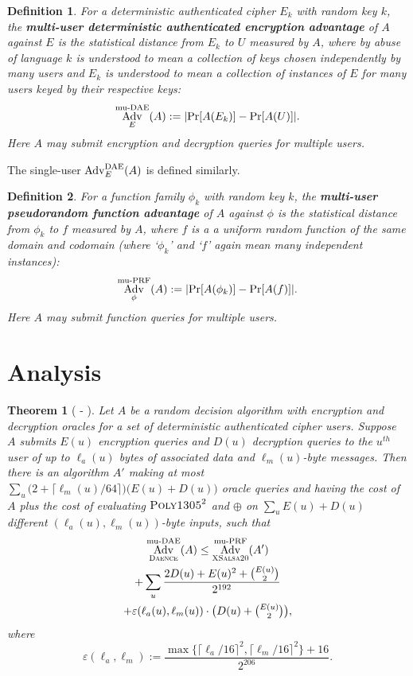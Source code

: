 \documentclass[draft]{article}
\newtheorem{definition}{Definition}
\newtheorem{theorem}{Theorem}
\newcommand{\term}[1]{\textbf{#1}}
\def\operatorsc#1{{%
  \ifmmode\let\next=\operatorname\else\let\next=\relax\fi\next{\textsc{#1}}}}
\def\Salsa#1/{\operatorsc{Salsa#1}}
\def\XSalsa#1/{\operatorsc{XSalsa#1}}
\def\Poly#1/{\operatorsc{Poly#1}}
\def\Daence/{\operatorsc{Daence}}
\def\muPRF{%
  \ifmmode\def\next{\operatorname{mu-PRF}}%
    \else\def\next/{mu-\textsc{prf}}%
  \fi\next}
\def\DAE{%
  \ifmmode\def\next{\operatorname{DAE}}%
    \else\def\next/{\textsc{dae}}%
  \fi\next}
\def\muDAE{%
  \ifmmode\def\next{\operatorname{mu-DAE}}%
    \else\def\next/{mu-\textsc{dae}}%
  \fi\next}
\DeclareMathOperator{\Adv}{Adv}
\newcommand{\collisionbound}{\varepsilon}
\begin{document}
\begin{definition}
  For a deterministic authenticated cipher $E_k$ with random key $k$,
   the
   \term{multi-user deterministic authenticated encryption advantage}
   of $A$ against $E$ is the statistical distance from $E_k$ to $U$
   measured by $A$, where by abuse of language $k$ is understood to
   mean a collection of keys chosen independently by many users and
   $E_k$ is understood to mean a collection of instances of $E$ for
   many users keyed by their respective keys:
  \[
    \Adv^{\muDAE}_E(A) := \lvert\Pr[A(E_k)] - \Pr[A(U)]\rvert.
  \]
  Here $A$ may submit encryption and decryption queries for
   \emph{multiple} users.
\end{definition}

The single-user $\Adv^{\DAE}_E(A)$ is defined similarly.

\begin{definition}
  For a function family $\phi_k$ with random key $k$, the
   \term{multi-user pseudorandom function advantage}
   of $A$ against $\phi$ is the statistical distance from $\phi_k$ to
   $f$ measured by $A$, where $f$ is a a uniform random function of
   the same domain and codomain (where `$\phi_k$' and `$f$' again
   mean many independent instances):
  \[
    \Adv^{\muPRF}_\phi(A) := \lvert\Pr[A(\phi_k)] - \Pr[A(f)]\rvert.
  \]
  Here $A$ may submit function queries for \emph{multiple} users.
\end{definition}

\section{Analysis}

\begin{theorem}[\Salsa20/-\Daence/]\label{thm-salsa20-daence}
  Let $A$ be a random decision algorithm with encryption and
   decryption oracles for a set of deterministic authenticated
   cipher users.
  Suppose $A$ submits $E(u)$ encryption queries and $D(u)$ decryption
   queries to the $u^{\mathit{th}}$ user of up to $\ell_a(u)$ bytes of
   associated data and $\ell_m(u)$-byte messages.
  Then there is an algorithm $A'$ making at most
   $\sum_u \bigl(2 + \lceil\ell_m(u)/64\rceil\bigr)
     \bigl(E(u) + D(u)\bigr)$
   oracle queries and having the cost of $A$ plus the cost of
   evaluating $\Poly1305/^2$ and $\oplus$ on
   $\sum_u E(u) + D(u)$
   different $(\ell_a(u), \ell_m(u))$-byte inputs,
   such that
%
  \begin{multline*}
    \Adv^{\muDAE}_{\Daence/}(A)
     \leq \Adv^{\muPRF}_{\XSalsa20/}(A') \\
            + \sum_u
                \frac{2 D(u) + E(u)^2 + \binom{E(u)}{2}}
                     {2^{192}} \\
                + \collisionbound(\ell_a(u), \ell_m(u))
                  \cdot
                  {\textstyle\bigl(D(u) + \binom{E(u)}{2}\bigr)},
  \end{multline*}
%
   where
  \[
    \collisionbound(\ell_a, \ell_m)
    := \frac{\max\{\lceil\ell_a/16\rceil^2, \lceil\ell_m/16\rceil^2\}
             + 16}
            {2^{206}}.
  \]
\end{theorem}
\end{document}
